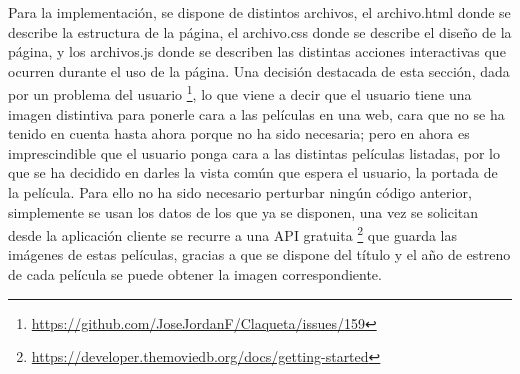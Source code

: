 Para la implementación, se dispone de distintos archivos, el archivo.html donde se describe la estructura de la 
página, el archivo.css donde se describe el diseño de la página, y los archivos.js donde se describen las distintas 
acciones interactivas que ocurren durante el uso de la página. Una decisión destacada de esta sección, dada por un 
problema del usuario \footnote{\url{https://github.com/JoseJordanF/Claqueta/issues/159}}, lo que viene a decir que el 
usuario tiene una imagen distintiva para ponerle cara a las películas en una web, cara que no se ha tenido en cuenta 
hasta ahora porque no ha sido necesaria; pero en ahora es imprescindible que el usuario ponga cara a las distintas 
películas listadas, por lo que se ha decidido en darles la vista común que espera el usuario, la portada de la 
película. Para ello no ha sido necesario perturbar ningún código anterior, simplemente se usan los datos de los que 
ya se disponen, una vez se solicitan desde la aplicación cliente se recurre a una API gratuita
\footnote{\url{https://developer.themoviedb.org/docs/getting-started}} que guarda las imágenes de estas películas, 
gracias a que se dispone del título y el año de estreno de cada película se puede obtener la imagen correspondiente.